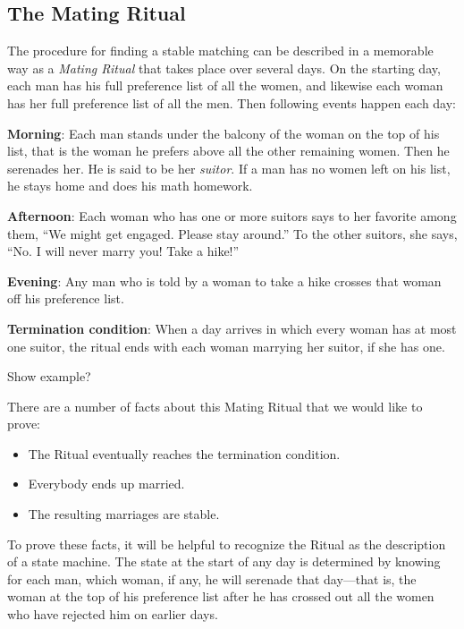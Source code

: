 \subsection{The Mating Ritual}\label{mating_ritual_sec}

The procedure for finding a stable matching can be described in a
memorable way as a \emph{Mating Ritual} that takes place over several
days.  On the starting day, each man has his full preference list of
all the women, and likewise each woman has her full preference list of
all the men.  Then following events happen each day:

\textbf{Morning}: Each man stands under the balcony of the woman on
the top of his list, that is the woman he prefers above all the other
remaining women.  Then he serenades her.  He is said to be her
\emph{suitor}.  If a man has no women left on his list, he stays home
and does his math homework.

\textbf{Afternoon}: Each woman who has one or more suitors says to her
favorite among them, ``We might get engaged.  Please stay around.''
To the other suitors, she says, ``No.  I will never marry you!  Take a
hike!''

\textbf{Evening}: Any man who is told by a woman to take a hike
crosses that woman off his preference list.

\textbf{Termination condition}: When a day arrives in which every
woman has at most one suitor, the ritual ends with each woman marrying
her suitor, if she has one.

\begin{editingnotes}
Show example?
\end{editingnotes}

There are a number of facts about this Mating Ritual that we would like to
prove:

\begin{itemize}
\item The Ritual eventually reaches the termination condition.
\item Everybody ends up married.
\item The resulting marriages are stable.
\end{itemize}

To prove these facts, it will be helpful to recognize the Ritual as
the description of a state machine.  The state at the start of any day
is determined by knowing for each man, which woman, if any, he will
serenade that day---that is, the woman at the top of his preference
list after he has crossed out all the women who have rejected him on
earlier days.

